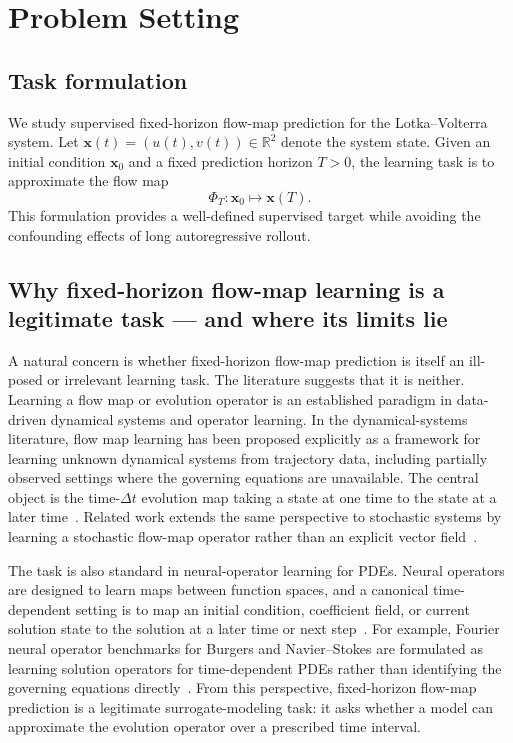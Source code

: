 \documentclass[11pt]{article}
\begin{document}
\section{Problem Setting}

\subsection{Task formulation}

We study supervised fixed-horizon flow-map prediction for the Lotka--Volterra system.
Let $\bm{x}(t) = (u(t), v(t)) \in \mathbb{R}^2$ denote the system state.
Given an initial condition $\bm{x}_0$ and a fixed prediction horizon $T > 0$, the learning task is to approximate the flow map
\[
\Phi_T : \bm{x}_0 \mapsto \bm{x}(T).
\]
This formulation provides a well-defined supervised target while avoiding the confounding effects of long autoregressive rollout.

\subsection{Why fixed-horizon flow-map learning is a legitimate task --- and where its limits lie}
\label{sec:flowmap-legitimacy}

A natural concern is whether fixed-horizon flow-map prediction is itself an ill-posed or irrelevant learning task.
The literature suggests that it is neither.
Learning a flow map or evolution operator is an established paradigm in data-driven dynamical systems and operator learning.
In the dynamical-systems literature, flow map learning has been proposed explicitly as a framework for learning unknown dynamical systems from trajectory data, including partially observed settings where the governing equations are unavailable.
The central object is the time-$\Delta t$ evolution map taking a state at one time to the state at a later time~\cite{churchill2023fml}.
Related work extends the same perspective to stochastic systems by learning a stochastic flow-map operator rather than an explicit vector field~\cite{chen2024sfml}.

The task is also standard in neural-operator learning for PDEs.
Neural operators are designed to learn maps between function spaces, and a canonical time-dependent setting is to map an initial condition, coefficient field, or current solution state to the solution at a later time or next step~\cite{kovachki2023neuralops,li2021fno}.
For example, Fourier neural operator benchmarks for Burgers and Navier--Stokes are formulated as learning solution operators for time-dependent PDEs rather than identifying the governing equations directly~\cite{li2021fno,kovachki2023neuralops}.
From this perspective, fixed-horizon flow-map prediction is a legitimate surrogate-modeling task: it asks whether a model can approximate the evolution operator over a prescribed time interval.
\end{document}
